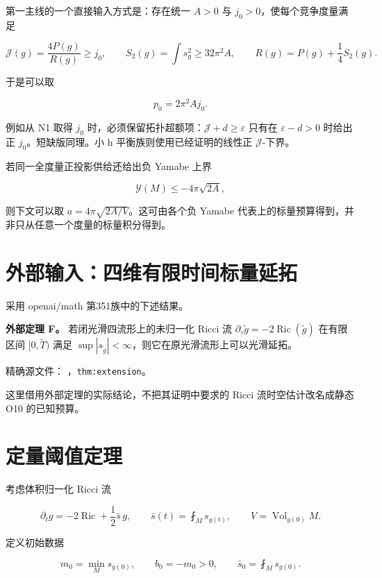 \documentclass[UTF8,11pt,openany,oneside,fontset=none]{ctexbook}
\begin{document}
第一主线的一个直接输入方式是：存在统一 \(A>0\) 与 \(j_0>0\)，使每个竞争度量满足

\[
 \mathcal J(g)=\frac{4P(g)}{R(g)}\ge j_0,
 \qquad S_2(g)=\int s_g^2\ge32\pi^2A,
 \qquad R(g)=P(g)+\frac14S_2(g).
\]

于是可以取

\[
 \boxed{p_0=2\pi^2 A j_0.}
\]

例如从 N1 取得 \(j_0\) 时，必须保留拓扑超额项：\(\mathcal J+d\ge\varepsilon\) 只有在 \(\varepsilon-d>0\) 时给出正 \(j_0\)。短缺版同理。小 h 平衡族则使用已经证明的线性正 \(\mathcal J\)-下界。

若同一全度量正投影供给还给出负 Yamabe 上界

\[
 \mathcal Y(M)\le-4\pi\sqrt{2A},
\]

则下文可以取 \(a=4\pi\sqrt{2A/V}\)。这可由各个负 Yamabe 代表上的标量预算得到，并非只从任意一个度量的标量积分得到。

\section{外部输入：四维有限时间标量延拓}\label{ch7:ux5916ux90e8ux8f93ux5165ux56dbux7ef4ux6709ux9650ux65f6ux95f4ux6807ux91cfux5ef6ux62d3}

采用 openai/math 第351族中的下述结果。

\textbf{外部定理 F。} 若闭光滑四流形上的未归一化 Ricci 流 \(\partial_\tau\widetilde g=-2\operatorname{Ric}(\widetilde g)\) 在有限区间 \([0,\widetilde T)\) 满足 \(\sup|s_{\widetilde g}|<\infty\)，则它在原光滑流形上可以光滑延拓。

精确源文件： ，\texttt{thm:extension}。

这里借用外部定理的实际结论，不把其证明中要求的 Ricci 流时空估计改名成静态 O10 的已知预算。

\section{定量阈值定理}\label{ch7:ux5b9aux91cfux9608ux503cux5b9aux7406}

考虑体积归一化 Ricci 流

\[
 \partial_t g=-2\operatorname{Ric}+\frac12\bar s\,g,
 \qquad \bar s(t)=\fint_M s_{g(t)},
 \qquad V=\operatorname{Vol}_{g(0)}M.
\]

定义初始数据

\[
 m_0=\min_Ms_{g(0)},\qquad b_0=-m_0>0,
 \qquad \bar s_0=\fint_Ms_{g(0)}.
\]
\end{document}
